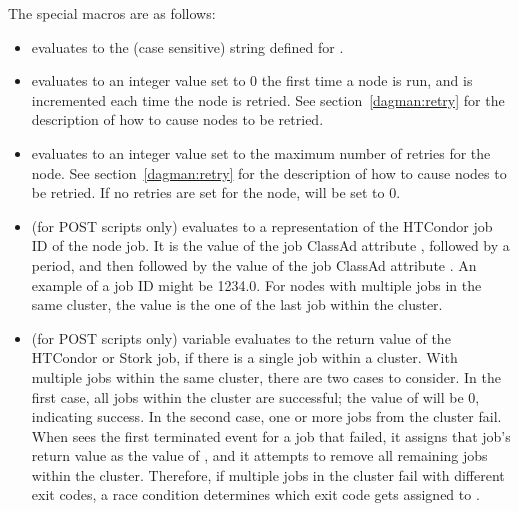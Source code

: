 \begin{itemize}
The special macros are as follows:

\begin{itemize}
\item {}
 evaluates to the (case sensitive) string
defined for .

\item {}
 evaluates to an 
integer value set to 0 the first time a node is run,
and is incremented each time the node is retried. 
See section~\ref{dagman:retry} for the description of how to cause
nodes to be retried. 

\item {}
 evaluates to an integer value set 
to the maximum number of retries for the node.
See section~\ref{dagman:retry} for the description of how to cause
nodes to be retried.  
If no retries are set for the node,
 will be set to 0.

\item {}
 (for POST scripts only)
evaluates to a representation of the HTCondor job ID of the node job.
It is the value of the job ClassAd attribute ,
followed by a period,
and then followed by the value of the job ClassAd attribute .
An example of a job ID might be 1234.0.
For nodes with multiple jobs in the same cluster,
the  value is the one of the last job within the cluster.

\item {}
 (for POST scripts only) variable evaluates to
the return value of the 
HTCondor or Stork job, if there is a single job within a cluster.
With multiple jobs within the same cluster,
there are two cases to consider.
In the first case, all jobs within the cluster are successful;
the value of  will be 0, indicating success.
In the second case,
one or more jobs from the cluster fail.
When  sees the first terminated event for a job that failed,
it assigns that job's return value as the value of ,
and it attempts to remove all remaining jobs within the cluster.
Therefore, if multiple jobs in the cluster fail with different exit codes,
a race condition determines which exit code gets assigned to .


\end{itemize}
\end{itemize}
